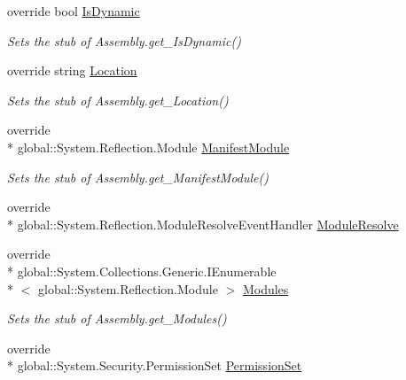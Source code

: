 \begin{DoxyCompactItemize}
override bool \hyperlink{class_system_1_1_reflection_1_1_fakes_1_1_stub_assembly_a3fda9dd49ce42b7fdbda870312a90be0}{Is\-Dynamic}
\begin{DoxyCompactList}\small\item\em Sets the stub of Assembly.\-get\-\_\-\-Is\-Dynamic()\end{DoxyCompactList}\item 
override string \hyperlink{class_system_1_1_reflection_1_1_fakes_1_1_stub_assembly_acfa4d04b127b31a571cc1479089c5dc9}{Location}
\begin{DoxyCompactList}\small\item\em Sets the stub of Assembly.\-get\-\_\-\-Location()\end{DoxyCompactList}\item 
override \\*
global\-::\-System.\-Reflection.\-Module \hyperlink{class_system_1_1_reflection_1_1_fakes_1_1_stub_assembly_a1af1fd7dc170b583cb09098fd08f0e7e}{Manifest\-Module}
\begin{DoxyCompactList}\small\item\em Sets the stub of Assembly.\-get\-\_\-\-Manifest\-Module()\end{DoxyCompactList}\item 
override \\*
global\-::\-System.\-Reflection.\-Module\-Resolve\-Event\-Handler \hyperlink{class_system_1_1_reflection_1_1_fakes_1_1_stub_assembly_a6f09680b54c1b0e33454e34b5799ff62}{Module\-Resolve}
\item 
override \\*
global\-::\-System.\-Collections.\-Generic.\-I\-Enumerable\\*
$<$ global\-::\-System.\-Reflection.\-Module $>$ \hyperlink{class_system_1_1_reflection_1_1_fakes_1_1_stub_assembly_ad98823ef984c6e1d729ceb4e24999441}{Modules}
\begin{DoxyCompactList}\small\item\em Sets the stub of Assembly.\-get\-\_\-\-Modules()\end{DoxyCompactList}\item 
override \\*
global\-::\-System.\-Security.\-Permission\-Set \hyperlink{class_system_1_1_reflection_1_1_fakes_1_1_stub_assembly_a14f943b9584c6b4271dd08d098c1a74c}{Permission\-Set}

\end{DoxyCompactItemize}
